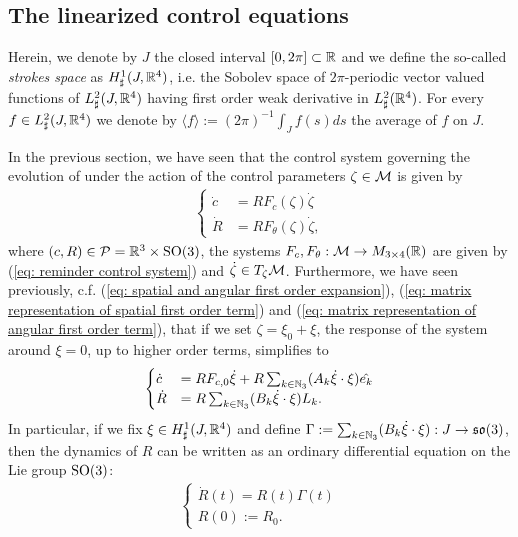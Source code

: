 \subsection{The linearized control equations}
Herein, we denote by $J$ the closed interval  $[0,2\pi] \subset \mathbb{R}$ and we define the so-called \emph{strokes space} as $H_\sharp^1(J, \mathbb{R}^4)$, i.e. the Sobolev space of $2\pi$-periodic vector valued functions of $L_{\sharp}^2(J, \mathbb{R}^4)$ having first order weak derivative in $L_{\sharp}^2(\mathbb{R}^4)$. For every $f \in L^{2}_{\sharp}(J, \mathbb{R}^4)$ we denote by $\langle f \rangle := (2\pi)^{-1} \int_{J} f(s) ds$ the average of $f$ on $J$.

In the previous section, we have seen that the control system governing the evolution of \spr under the action of the control parameters $\zeta \in \mathcal{M}$ is given by
\begin{align}
\begin{cases}
	\dot{c} &= R F_c(\zeta) \dot{\zeta}\\
	\dot{R} &= R F_{\theta}(\zeta) \dot{\zeta},
\end{cases}
\end{align}
where $(c,R) \in \mathcal{P} = \mathbb{R}^3 \times \operatorname{SO}(3)$, the systems $F_{c}, F_{\theta}: \mathcal{M} \to M_{3 \times
 4}(\mathbb{R})$ are given by (\ref{eq: reminder control system}) and $\dot{\zeta}  \in T_{\zeta}\mathcal{M}$. Furthermore, we have seen previously, c.f. (\ref{eq: spatial and angular first order expansion}), (\ref{eq: matrix representation of spatial first order term}) and (\ref{eq: matrix representation of angular first order term}), that if we set $\zeta = \xi_0 + \xi$, the response of the system around $\xi = 0$, up to higher order terms, simplifies to
 \begin{align}
 \label{eq: dynamics first approx}
 \begin{cases}
 	\dot{c} &= R F_{c,0} \dot{\xi} + R \sum_{k \in \mathbb{N}_3}(A_k \dot{\xi} \cdot \xi)\hat{e_k}\\
 	\dot{R} &= R \sum_{k \in \mathbb{N}_3} (B_k \dot{\xi} \cdot \xi) L_k.
 \end{cases}
 \end{align}
In particular, if we fix $\xi \in H^1_{\sharp}(J, \mathbb{R}^4)$ and define $\Gamma := \sum_{k \in \mathbb{N}_3} (B_k \dot{\xi} \cdot \xi): J \to \mathfrak{so}(3)$, then the dynamics of $R$ can be written as an ordinary differential equation on the Lie group $\operatorname{SO}(3)$:
\begin{align}
\label{eq: orientation ode}
\begin{cases}
	\dot{R}(t) = R(t) \Gamma(t)\\
	R(0) := R_0.
\end{cases}
\end{align}

